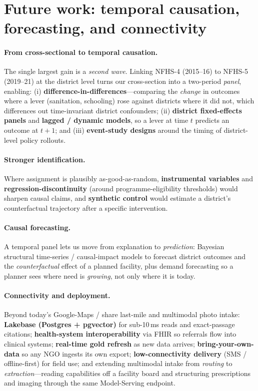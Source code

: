 \documentclass[11pt]{article}
\begin{document}
\section{Future work: temporal causation, forecasting, and connectivity}
\paragraph{From cross-sectional to temporal causation.} The single largest gain is a \emph{second wave}. Linking NFHS-4 (2015--16) to NFHS-5 (2019--21) at the district level turns our cross-section into a two-period \emph{panel}, enabling: (i) \textbf{difference-in-differences}---comparing the \emph{change} in outcomes where a lever (sanitation, schooling) rose against districts where it did not, which differences out time-invariant district confounders; (ii) \textbf{district fixed-effects panels} and \textbf{lagged / dynamic models}, so a lever at time $t$ predicts an outcome at $t{+}1$; and (iii) \textbf{event-study designs} around the timing of district-level policy rollouts.
\paragraph{Stronger identification.} Where assignment is plausibly as-good-as-random, \textbf{instrumental variables} and \textbf{regression-discontinuity} (around programme-eligibility thresholds) would sharpen causal claims, and \textbf{synthetic control} would estimate a district's counterfactual trajectory after a specific intervention.
\paragraph{Causal forecasting.} A temporal panel lets us move from explanation to \emph{prediction}: Bayesian structural time-series / causal-impact models to forecast district outcomes and the \emph{counterfactual} effect of a planned facility, plus demand forecasting so a planner sees where need is \emph{growing}, not only where it is today.
\paragraph{Connectivity and deployment.} Beyond today's Google-Maps / share last-mile and multimodal photo intake: \textbf{Lakebase (Postgres + pgvector)} for sub-10\,ms reads and exact-passage citations; \textbf{health-system interoperability} via FHIR so referrals flow into clinical systems; \textbf{real-time gold refresh} as new data arrives; \textbf{bring-your-own-data} so any NGO ingests its own export; \textbf{low-connectivity delivery} (SMS / offline-first) for field use; and extending multimodal intake from \emph{routing} to \emph{extraction}---reading capabilities off a facility board and structuring prescriptions and imaging through the same Model-Serving endpoint.
\end{document}
